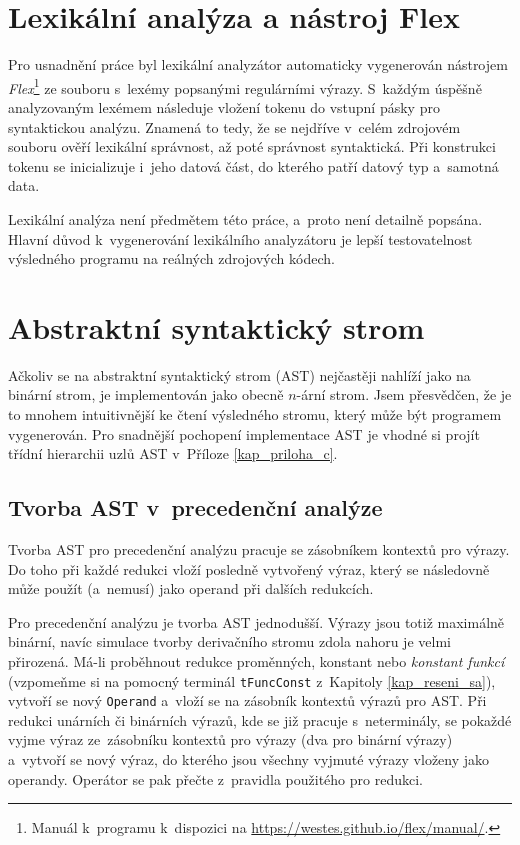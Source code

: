 \section{Lexikální analýza a nástroj Flex}
Pro usnadnění práce byl lexikální analyzátor automaticky vygenerován nástrojem \emph{Flex}\footnote{Manuál k~programu k~dispozici na \href{https://westes.github.io/flex/manual/}{https://westes.github.io/flex/manual/}.} ze souboru s~lexémy popsanými regulárními výrazy.
S~každým úspěšně analyzovaným lexémem následuje vložení tokenu do vstupní pásky pro syntaktickou analýzu.
Znamená to tedy, že se nejdříve v~celém zdrojovém souboru ověří lexikální správnost, až poté správnost syntaktická. 
Při konstrukci tokenu se inicializuje i~jeho datová část, do kterého patří datový typ a~samotná data.

Lexikální analýza není předmětem této práce, a~proto není detailně popsána.
Hlavní důvod k~vygenerování lexikálního analyzátoru je lepší testovatelnost výsledného programu na reálných zdrojových kódech.

\section{Abstraktní syntaktický strom}
Ačkoliv se na abstraktní syntaktický strom (AST) nejčastěji nahlíží jako na binární strom, je implementován jako obecně $n$-ární strom.
Jsem přesvědčen, že je to mnohem intuitivnější ke čtení výsledného stromu, který může být programem vygenerován.
Pro snadnější pochopení implementace AST je vhodné si projít třídní hierarchii uzlů AST v~Příloze \ref{kap_priloha_c}.

\subsection*{Tvorba AST v~precedenční analýze}
Tvorba AST pro precedenční analýzu pracuje se zásobníkem kontextů pro výrazy.
Do toho při každé redukci vloží posledně vytvořený výraz, který se následovně může použít (a~nemusí) jako operand při dalších redukcích.

Pro precedenční analýzu je tvorba AST jednodušší.
Výrazy jsou totiž maximálně binární, navíc simulace tvorby derivačního stromu zdola nahoru je velmi přirozená.
Má-li proběhnout redukce proměnných, konstant nebo \emph{konstant funkcí} (vzpomeňme si na pomocný terminál \texttt{t\textunderscore FuncConst} z~Kapitoly \ref{kap_reseni_sa}), vytvoří se nový \texttt{Operand} a~vloží se na zásobník kontextů výrazů pro AST.
Při redukci unárních či binárních výrazů, kde se již pracuje s~neterminály, se pokaždé vyjme výraz ze~zásobníku kontextů pro výrazy (dva pro binární výrazy) a~vytvoří se nový výraz, do kterého jsou všechny vyjmuté výrazy vloženy jako operandy.
Operátor se pak přečte z~pravidla použitého pro redukci.

